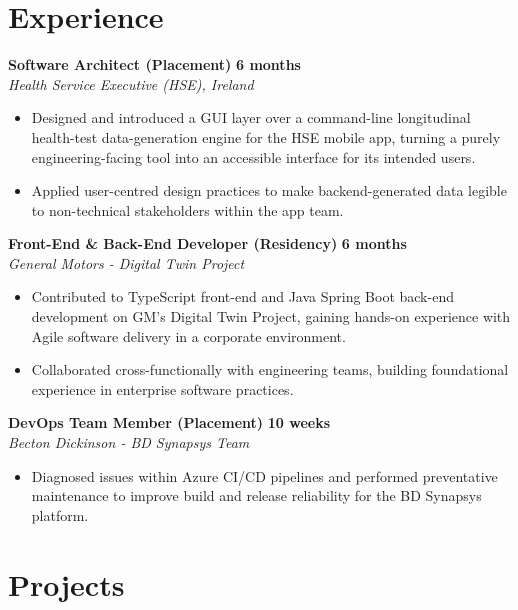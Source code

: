 \documentclass[10pt,a4paper]{article}
\newcommand{\cvEntry}[4]{%
  \noindent\textbf{#1} \hfill \textbf{\small #2} \\
  \textit{#3} \hfill \textit{\small #4} \\[-2pt]
}
\begin{document}
\section{Experience}\label{sec:experience}

\cvEntry{Software Architect (Placement)}{6 months}{Health Service Executive (HSE), Ireland}{}
\begin{itemize}
    \item Designed and introduced a GUI layer over a command-line longitudinal health-test data-generation engine for the HSE mobile app, turning a purely engineering-facing tool into an accessible interface for its intended users.
    \item Applied user-centred design practices to make backend-generated data legible to non-technical stakeholders within the app team.
\end{itemize}

\vspace{1.5pt}

\cvEntry{Front-End \& Back-End Developer (Residency)}{6 months}{General Motors - Digital Twin Project}{}
\begin{itemize}
    \item Contributed to TypeScript front-end and Java Spring Boot back-end development on GM's Digital Twin Project, gaining hands-on experience with Agile software delivery in a corporate environment.
    \item Collaborated cross-functionally with engineering teams, building foundational experience in enterprise software practices.
\end{itemize}

\vspace{1.5pt}

\cvEntry{DevOps Team Member (Placement)}{10 weeks}{Becton Dickinson - BD Synapsys Team}{}
\begin{itemize}
    \item Diagnosed issues within Azure CI/CD pipelines and performed preventative maintenance to improve build and release reliability for the BD Synapsys platform.
\end{itemize}

\vspace{2pt}

\section{Projects}\label{sec:projects}
\end{document}
